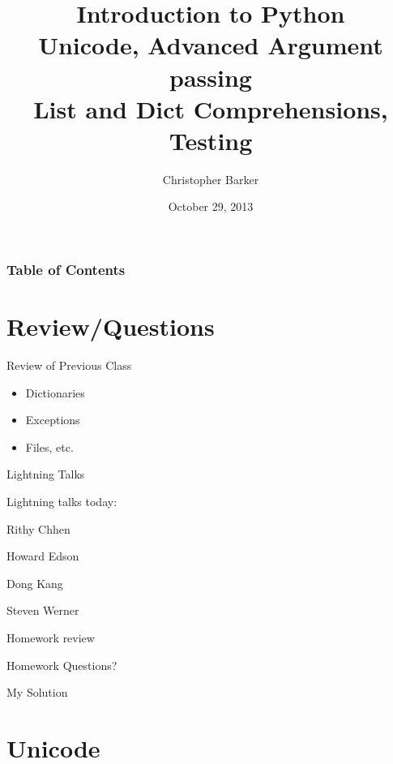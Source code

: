 \documentclass{beamer}
\title[Intro to Python: Week 1]{Introduction  to Python\\
Unicode, Advanced Argument passing\\
List and Dict Comprehensions, Testing
}
\author{Christopher Barker}
\institute{UW Continuing Education}
\date{October 29, 2013}
\begin{document}
\begin{frame}
  \titlepage
\end{frame}

\begin{frame}
\frametitle{Table of Contents}
  \tableofcontents
\end{frame}


\section{Review/Questions}

\begin{frame}{Review of Previous Class}

\begin{itemize}
  \item Dictionaries
  \item Exceptions
  \item Files, etc.
\end{itemize}

\end{frame}


\begin{frame}{Lightning Talks}

\vfill
{\LARGE Lightning talks today:}

\vfill
{\Large
Rithy Chhen

\vfill
Howard Edson

\vfill
Dong Kang

\vfill
Steven Werner

}
\vfill

\end{frame}


\begin{frame}{Homework review}

  \vfill
  {\Large Homework Questions? }

  \vfill
  {\Large My Solution}

  \vfill
\end{frame}

\section{Unicode}
\end{document}

